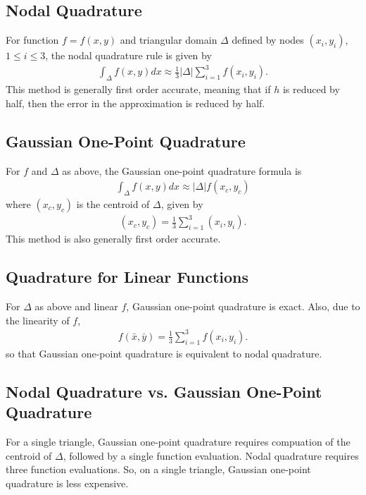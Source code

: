 \documentclass[12pt]{amsart}
\begin{document}
\subsection{Nodal Quadrature}
For function $f = f(x,y)$ and triangular domain $\Delta$ defined by nodes
$(x_i,y_i)$, $1 \leq i \leq 3$, the nodal quadrature rule is given by 
%
\begin{eqnarray}
	\int_\Delta f(x,y) dx \approx \frac{1}{3} |\Delta| \sum_{i=1}^{3} f(x_i,y_i). 
\end{eqnarray}
%
This method is generally first order accurate, meaning that if $h$ is reduced
by half, then the error in the approximation is reduced by half. 


\subsection{Gaussian One-Point Quadrature}
For $f$ and $\Delta$ as above, the Gaussian one-point quadrature formula is 
%
\begin{eqnarray}
	\int_\Delta f(x,y) dx \approx |\Delta| f(x_c,y_c)
\end{eqnarray}
%
where $(x_c,y_c)$ is the centroid of $\Delta$, given by 
%
\begin{eqnarray}
	(x_c,y_c) = \frac{1}{3} \sum_{i=1}^{3} (x_i,y_i).	
\end{eqnarray}
%
This method is also generally first order accurate.


\subsection{Quadrature for Linear Functions}
For $\Delta$ as above and linear $f$, Gaussian one-point quadrature is exact.
Also, due to the linearity of $f$,
%
\begin{eqnarray}
	f(\bar{x},\bar{y}) = \frac{1}{3} \sum_{i=1}^{3} f(x_i,y_i).
\end{eqnarray}
%
so that Gaussian one-point quadrature is equivalent to nodal quadrature.


\subsection{Nodal Quadrature vs. Gaussian One-Point Quadrature}
For a single triangle, Gaussian one-point quadrature requires compuation of the
centroid of $\Delta$, followed by a single function evaluation. Nodal
quadrature requires three function evaluations. So, on a single triangle,
Gaussian one-point quadrature is less expensive. 
\end{document}
